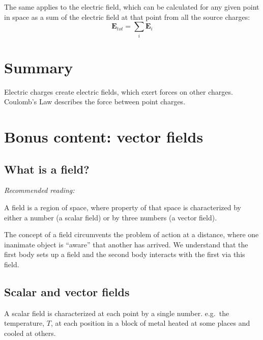 \documentclass[
  letterpaper,
  DIV=11,
  numbers=noendperiod]{scrreprt}
\begin{document}
The same applies to the electric field, which can be calculated for any
given point in space as a sum of the electric field at that point from
all the source charges:
\[ \mathrm{\mathbf{E}}_{tot} = \sum_i \mathrm{\mathbf{E}}_i \]

\section{Summary}\label{summary}

Electric charges create electric fields, which exert forces on other
charges. Coulomb's Law describes the force between point charges.

\section{Bonus content: vector
fields}\label{bonus-content-vector-fields}

\subsection{What is a field?}\label{what-is-a-field}

\emph{Recommended reading:}

A field is a region of space, where property of that space is
characterized by either a number (a scalar field) or by three numbers (a
vector field).

The concept of a field circumvents the problem of action at a distance,
where one inanimate object is ``aware'' that another has arrived. We
understand that the first body sets up a field and the second body
interacts with the first via this field.

\subsection{Scalar and vector fields}\label{scalar-and-vector-fields}

A scalar field is characterized at each point by a single number.
e.g.~the temperature, \(T\), at each position in a block of metal heated
at some places and cooled at others.
\end{document}
